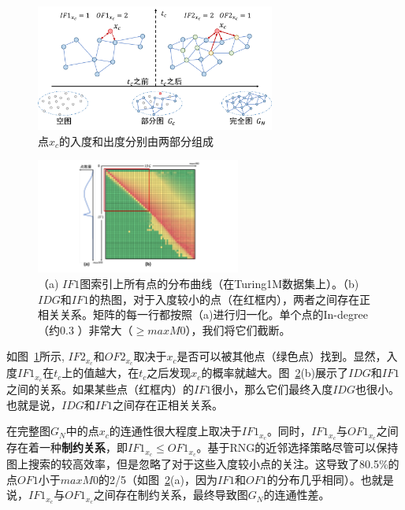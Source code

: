 \begin{figure}[htbp]
  \centering
  \includegraphics[width=0.7\textwidth]{figures/context-1/idg-odg.pdf}
  \caption{点$x_c$的入度和出度分别由两部分组成}
  \label{fig:idg-odg}
\end{figure}

\begin{figure}[tp]
  \centering
  \includegraphics[width=0.6\textwidth]{figures/context-1/IF1-IDG.pdf}
  \caption{（a) $IF1$图索引上所有点的分布曲线（在Turing1M数据集上）。（b) $IDG$和$IF1$的热图，对于入度较小的点（在红框内），两者之间存在正相关关系。矩阵的每一行都按照（a)进行归一化。单个点的In-degree（约0.3 \textperthousand）非常大（$\geq maxM0$），我们将它们截断。}
  \label{fig:if1-idg}
\end{figure}

如图~\ref{fig:idg-odg}所示, $IF2_{x_c}$和$OF2_{x_c}$取决于$x_c$是否可以被其他点（绿色点）找到。显然，入度$IF1_{x_c}$在$t_c$上的值越大，在$t_c$之后发现$x_c$的概率就越大。图~\ref{fig:if1-idg}(b)展示了$IDG$和$IF1$之间的关系。如果某些点（红框内）的$IF1$很小，那么它们最终入度$IDG$也很小。也就是说，$IDG$和$IF1$之间存在正相关关系。

在完整图$G_N$中的点$x_c$的连通性很大程度上取决于$IF1_{x_c}$。同时，$IF1_{x_c}$与$OF1_{x_c}$之间存在着一种\textbf{制约关系}，即$IF1_{x_c} \leq OF1_{x_c}$。基于RNG的近邻选择策略尽管可以保持图上搜索\cite{hnsw-2018}的较高效率，但是忽略了对于这些入度较小点的关注。这导致了80.5\%的点$OF1$小于$maxM0$的2/5（如图~\ref{fig:if1-idg}(a)，因为$IF1$和$OF1$的分布几乎相同）。也就是说，$IF1_{x_c}$与$OF1_{x_c}$之间存在制约关系，最终导致图$G_N$的连通性差。

